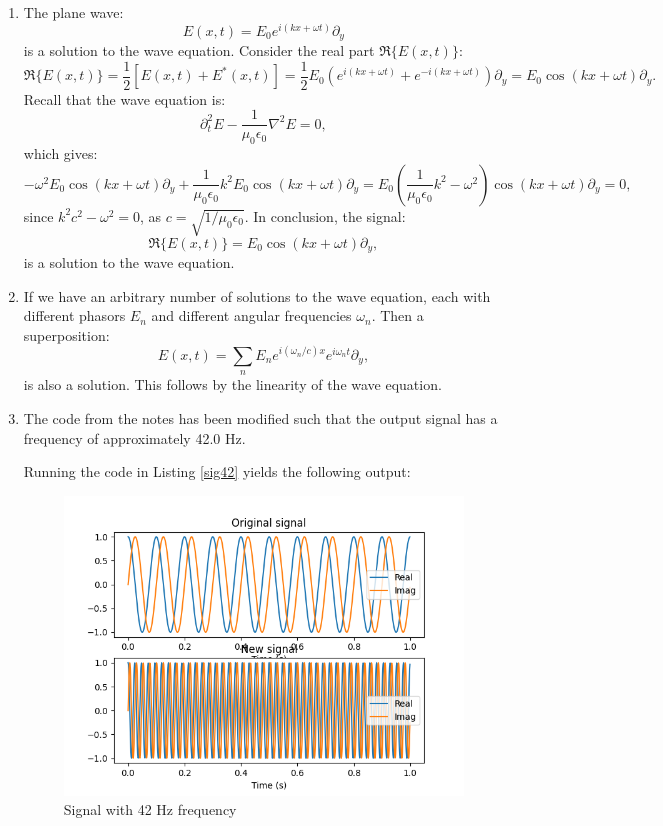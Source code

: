 \begin{enumerate}
\item The plane wave:
$$E(x,t)=E_{0}e^{i(kx+\omega t)}\partial_{y}$$
is a solution to the wave equation. Consider the real part $\Re\{E(x,t)\}$:
$$\Re\{E(x,t)\}=\frac{1}{2}[E(x,t)+E^{*}(x,t)]=\frac{1}{2}E_{0}(e^{i(kx+\omega t)}+e^{-i(kx+\omega t)})\partial_{y}=E_{0}\cos(kx+\omega t)\partial_{y}.$$
Recall that the wave equation is:
$$\partial_{t}^{2}E-\frac{1}{\mu_{0}\epsilon_{0}}\nabla^{2}E=0,$$
which gives:
$$-\omega^{2}E_{0}\cos(kx+\omega t)\partial_{y}+\frac{1}{\mu_{0}\epsilon_{0}}k^{2}E_{0}\cos(kx+\omega t)\partial_{y}=E_{0}\left(\frac{1}{\mu_{0}\epsilon_{0}}k^{2}-\omega^{2}\right)\cos(kx+\omega t)\partial_{y}=0,$$
since $k^{2}c^{2}-\omega^{2}=0$, as $c=\sqrt{1/\mu_0\epsilon_0}$. In conclusion, the signal:
$$\Re\{E(x,t)\}=E_{0}\cos(kx+\omega t)\partial_{y},$$
is a solution to the wave equation. 

\item If we have an arbitrary number of solutions to the wave equation, each with different 
phasors $E_{n}$ and different angular frequencies $\omega_{n}$. Then a superposition:
$$E(x,t)=\sum_{n}E_{n}e^{i(\omega_{n}/c)x}e^{i\omega_{n}t}\partial_{y},$$
is also a solution. This follows by the linearity of the wave equation. 

\item The code from the notes has been modified such that the output signal has a frequency of approximately 42.0 Hz. 

Running the code in Listing \ref{sig42} yields the following output:
\begin{figure}[h!]
    \centering
    \includegraphics[scale=1.0]{ch06/figures/ex6a.png}
    \caption{Signal with 42 Hz frequency}
\end{figure}


\end{enumerate}

